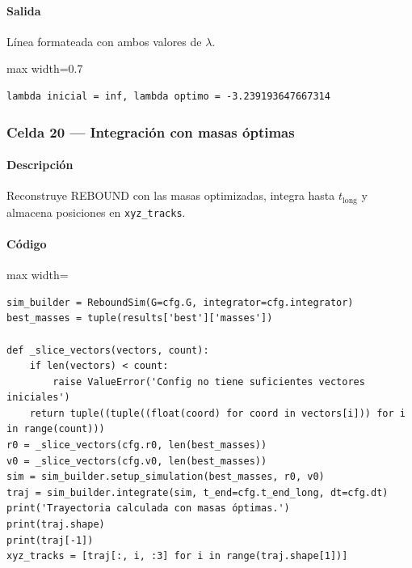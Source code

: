 \paragraph{Salida} Línea formateada con ambos valores de $\lambda$.

\begin{listing}[H]
\caption{Ejemplo Salida}
\begin{adjustbox}{max width=0.7\textwidth}
\begin{minipage}{\textwidth}
\begin{verbatim}
lambda inicial = inf, lambda optimo = -3.239193647667314
\end{verbatim}
\end{minipage}
\end{adjustbox}
\end{listing}

\subsubsection*{Celda 20 — Integración con masas óptimas}
\paragraph{Descripción} Reconstruye REBOUND con las masas optimizadas, integra hasta $t_{\text{long}}$ y almacena posiciones en \texttt{xyz\_tracks}.
\paragraph{Código}
\begin{listing}[H]
\caption{Celda 20: integración prolongada con las masas ganadoras}
\begin{adjustbox}{max width=\textwidth}
\begin{minipage}{\textwidth}
\begin{verbatim}
sim_builder = ReboundSim(G=cfg.G, integrator=cfg.integrator)
best_masses = tuple(results['best']['masses'])

def _slice_vectors(vectors, count):
    if len(vectors) < count:
        raise ValueError('Config no tiene suficientes vectores iniciales')
    return tuple((tuple((float(coord) for coord in vectors[i])) for i in range(count)))
r0 = _slice_vectors(cfg.r0, len(best_masses))
v0 = _slice_vectors(cfg.v0, len(best_masses))
sim = sim_builder.setup_simulation(best_masses, r0, v0)
traj = sim_builder.integrate(sim, t_end=cfg.t_end_long, dt=cfg.dt)
print('Trayectoria calculada con masas óptimas.')
print(traj.shape)
print(traj[-1])
xyz_tracks = [traj[:, i, :3] for i in range(traj.shape[1])]
\end{verbatim}
\end{minipage}
\end{adjustbox}
\end{listing}

